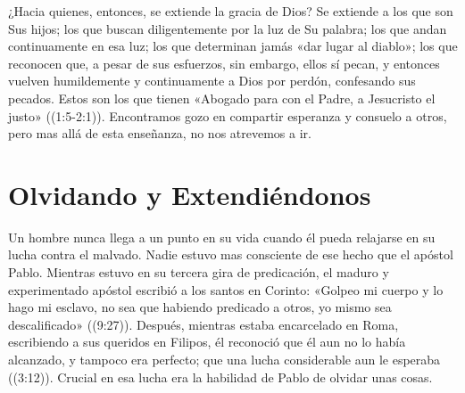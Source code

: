 \documentclass[12pt, twoside, openright]{book}
\begin{document}
¿Hacia quienes, entonces, se extiende la gracia de Dios? Se extiende a los que son Sus hijos; los que buscan diligentemente por la luz de Su palabra; los que andan continuamente en esa luz; los que determinan jamás «dar lugar al diablo»; los que reconocen que, a pesar de sus esfuerzos, sin embargo, ellos sí pecan, y entonces vuelven humildemente y continuamente a Dios por perdón, confesando sus pecados. Estos son los que tienen «Abogado para con el Padre, a Jesucristo el justo» ((1:5-2:1)). Encontramos gozo en compartir esperanza y consuelo a otros, pero mas allá de esta enseñanza, no nos atrevemos a ir.

\section{Olvidando y Extendiéndonos}
Un hombre nunca llega a un punto en su vida cuando él pueda relajarse en su lucha contra el malvado. Nadie estuvo mas consciente de ese hecho que el apóstol Pablo. Mientras estuvo en su tercera gira de predicación, el maduro y experimentado apóstol escribió a los santos en Corinto: «Golpeo mi cuerpo y lo hago mi esclavo, no sea que habiendo predicado a otros, yo mismo sea descalificado» ((9:27)). Después, mientras estaba encarcelado en Roma, escribiendo a sus queridos en Filipos, él reconoció que él aun no lo había alcanzado, y tampoco era perfecto; que una lucha considerable aun le esperaba ((3:12)). Crucial en esa lucha era la habilidad de Pablo de olvidar unas cosas.
\end{document}
